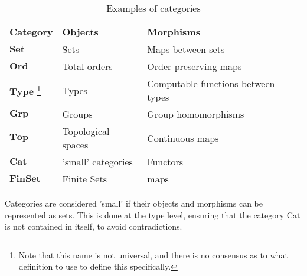 \begin{table}
	\begin{tabular}{|l|l|l|}
		\hline
		\textbf{Category} & \textbf{Objects} & \textbf{Morphisms} \\
			\hline
			$\mathbf{Set}$                                                                                                                                       & Sets               & Maps between sets                 \\
			\hline
			$\mathbf{Ord}$                                                                                                                                       & Total orders       & Order preserving maps             \\
			\hline
			$\mathbf{Type}$ \footnote{Note that this name is not universal, and there is no consensus as to what definition to use to define this specifically.} & Types              & Computable functions between types\\
			\hline
			$\mathbf{Grp}$                                                                                                                                       & Groups             & Group homomorphisms               \\
			\hline
			$\mathbf{Top}$                                                                                                                                       & Topological spaces & Continuous maps                   \\
			\hline
			$\mathbf{Cat}$                                                                                                                                       & 'small' categories & Functors                          \\
			\hline
			$\mathbf{FinSet}$                                                                                                                                    & Finite Sets        & maps                              \\
			\hline
	\end{tabular}
	\caption{Examples of categories}
\end{table}
\begin{note}
	Categories are considered 'small' if their objects and morphisms can be
	represented as sets. This is done at the type level, ensuring that the
	category $\mathrm{Cat}$ is not contained in itself, to avoid
	contradictions.
\end{note}
